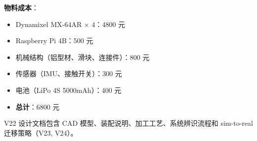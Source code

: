 \textbf{物料成本}：
\begin{itemize}
    \item Dynamixel MX-64AR × 4：4800 元
    \item Raspberry Pi 4B：500 元
    \item 机械结构（铝型材、滑块、连接件）：800 元
    \item 传感器（IMU、接触开关）：300 元
    \item 电池（LiPo 4S 5000mAh）：400 元
    \item \textbf{总计}：6800 元
\end{itemize}

V22 设计文档包含 CAD 模型、装配说明、加工工艺、系统辨识流程和 sim-to-real 迁移策略（V23, V24）。
